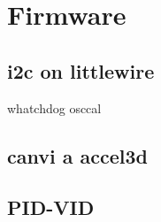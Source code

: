 \chapter{Firmware}
\section{i2c on littlewire}
whatchdog
osccal
\section{canvi a accel3d}
\section{PID-VID}
